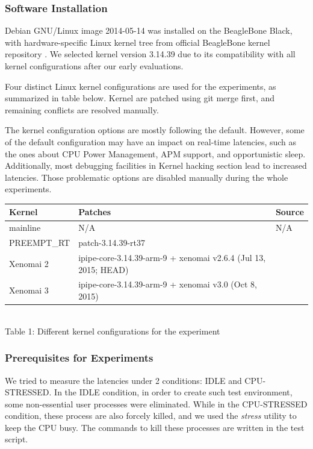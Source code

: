 \documentclass[10pt,a4paper]{article}
\begin{document}
\begin{multicols}{2}
\subsubsection{Software Installation}
Debian GNU/Linux image 2014-05-14 \cite{debian} was installed on the BeagleBone Black, with hardware-specific Linux kernel tree from official BeagleBone kernel repository \cite{kernel}. We selected kernel version 3.14.39 due to its compatibility with all kernel configurations after our early evaluations.

Four distinct Linux kernel configurations are used for the experiments, as summarized in table below. Kernel are patched using git merge first, and remaining conflicts are resolved manually.

The kernel conﬁguration options are mostly following the default. However, some of the default configuration may have an impact on real-time latencies, such as the ones about CPU Power Management, APM support, and opportunistic sleep. Additionally, most debugging facilities in Kernel hacking section lead to increased latencies. Those problematic options are disabled manually during the whole experiments.

\begin{tabular}{|l| p{3cm} |l|}
\hline
Kernel & Patches & Source\\ \hline
mainline   & N/A & N/A \\ \hline
PREEMPT\_RT & patch-3.14.39-rt37 & \cite{p-rt} \\ \hline
Xenomai 2  & ipipe-core-3.14.39-arm-9 + xenomai v2.6.4 (Jul 13, 2015; HEAD) & \cite{p-ipipe} \cite{git-x2.6} \\ \hline
Xenomai 3  & ipipe-core-3.14.39-arm-9 + xenomai v3.0 (Oct 8, 2015) & \cite{p-ipipe} \cite{git-x3} \\ \hline
\end{tabular}\\
Table 1: Different kernel configurations for the experiment\\

\subsubsection{Prerequisites for Experiments}
We tried to measure the latencies under 2 conditions: IDLE and CPU-STRESSED. In the IDLE condition, in order to create such test environment, some non-essential user processes were eliminated. While in the CPU-STRESSED condition, these process are also forcely killed, and we used the \textit{stress} \cite{stress} utility to keep the CPU busy. The commands to kill these processes are written in the test script.


\end{multicols}
\end{document}

